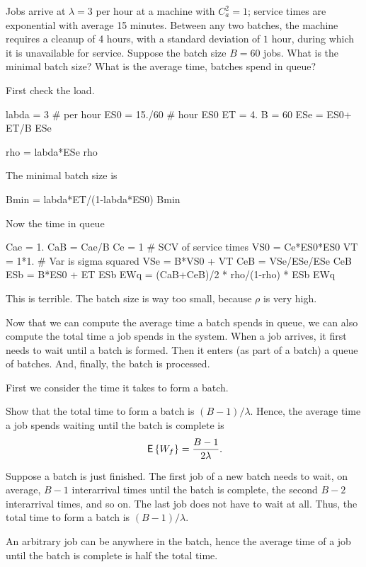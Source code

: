 \begin{exercise}
  Jobs arrive at $\lambda=3$ per hour at a machine with $C_a^2=1$; service times are exponential with average 15 minutes.  Between any two batches, the machine requires a cleanup of 4 hours, with a standard deviation of $1$ hour, during which it is unavailable for service.  Suppose the batch size $B=60$ jobs. What is the minimal batch size?  What is the average time, batches spend in queue? 
  \begin{solution}
First check the load.
\begin{pyconsole}
labda = 3 # per hour
ES0 = 15./60 # hour
ES0
ET = 4.
B = 60
ESe = ES0+ ET/B
ESe

rho = labda*ESe
rho
\end{pyconsole}

The minimal batch size is
\begin{pyconsole}
Bmin = labda*ET/(1-labda*ES0)
Bmin
\end{pyconsole}

Now the time in queue
\begin{pyconsole}
Cae = 1.
CaB = Cae/B
Ce = 1 # SCV of service times
VS0 = Ce*ES0*ES0
VT = 1*1. # Var is sigma squared
VSe = B*VS0 + VT
CeB = VSe/ESe/ESe
CeB
ESb = B*ES0 + ET
ESb
EWq = (CaB+CeB)/2 * rho/(1-rho) * ESb
EWq
\end{pyconsole}

This is terrible.  The batch size is way too small, because $\rho$ is very high.
  \end{solution}
\end{exercise}

Now that we can compute the average time a batch spends in queue, we can also compute the total time a job spends in the system. When a job arrives, it first needs to wait until a batch is formed. Then it enters (as part of a batch) a queue of batches. And, finally,  the batch is processed. 

First we consider the time it takes to form a batch. 
\begin{exercise}
  Show that the total time to form a batch is $(B-1)/\lambda$. Hence, the average time a job spends 
waiting until the batch is complete is
\begin{equation*}
  \,\mathsf{E}\left\{W_f\right\} = \frac{B-1}{2\lambda}.
\end{equation*}
\begin{solution}
  Suppose a batch is just finished. The first job of a new batch needs to wait, on average, $B-1$  interarrival times until the batch is complete, the second $B-2$ interarrival times, and so on. The last job does not have to wait at all. Thus, the total time to form a batch is $(B-1)/\lambda$. 

An arbitrary job can be anywhere in the batch, hence the average time of a job until the batch is complete is half the total time. 
\end{solution}
\end{exercise}

